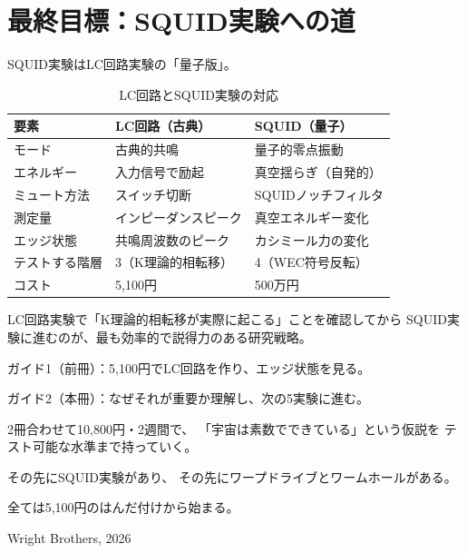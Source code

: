 \documentclass[12pt,a4paper]{article}
\begin{document}
\section{最終目標：SQUID実験への道}

SQUID実験はLC回路実験の「量子版」。

\begin{table}[h]
\centering
\caption{LC回路とSQUID実験の対応}
\begin{tabular}{@{}lll@{}}
\toprule
要素 & LC回路（古典） & SQUID（量子） \\
\midrule
モード & 古典的共鳴 & 量子的零点振動 \\
エネルギー & 入力信号で励起 & 真空揺らぎ（自発的） \\
ミュート方法 & スイッチ切断 & SQUIDノッチフィルタ \\
測定量 & インピーダンスピーク & 真空エネルギー変化 \\
エッジ状態 & 共鳴周波数のピーク & カシミール力の変化 \\
テストする階層 & 3（K理論的相転移） & 4（WEC符号反転） \\
コスト & 5,100円 & 500万円 \\
\bottomrule
\end{tabular}
\end{table}

LC回路実験で「K理論的相転移が実際に起こる」ことを確認してから
SQUID実験に進むのが、最も効率的で説得力のある研究戦略。

\begin{keybox}[この2冊のガイドの位置づけ]
ガイド1（前冊）：5,100円でLC回路を作り、エッジ状態を見る。

ガイド2（本冊）：なぜそれが重要か理解し、次の5実験に進む。

2冊合わせて10,800円・2週間で、
「宇宙は素数でできている」という仮説を
テスト可能な水準まで持っていく。

その先にSQUID実験があり、
その先にワープドライブとワームホールがある。

全ては5,100円のはんだ付けから始まる。
\end{keybox}

\vfill
\begin{center}
{\small Wright Brothers, 2026}
\end{center}
\end{document}
